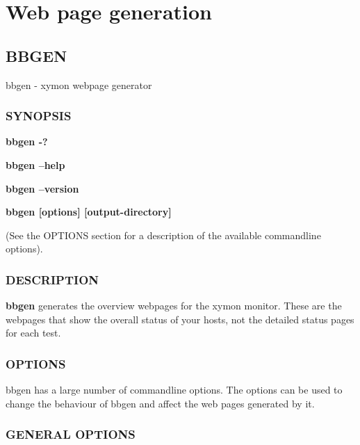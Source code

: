 %
\chapter{Web page generation}

%
\newpage
\section{BBGEN}

 bbgen - xymon webpage generator \subsection{SYNOPSIS}
\textbf{bbgen -?}
 
\textbf{bbgen --help}
 
\textbf{bbgen --version}
 
\textbf{bbgen [options] [output-directory]}
 
 (See the OPTIONS section for a description of the available commandline options). 

 
\subsection{DESCRIPTION}
\textbf{bbgen}
 generates the overview webpages for the xymon monitor. These are the
 webpages that show the overall status of your hosts, not the detailed
 status pages for each test. 


 
\subsection{OPTIONS}
 bbgen has a large number of commandline options. The options can be
 used to change the behaviour of bbgen and affect the web pages
 generated by it. 


 
\subsection{GENERAL OPTIONS}


